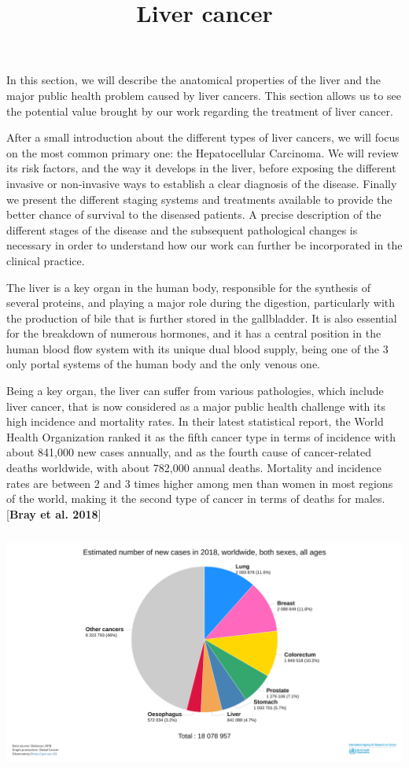 \documentclass[]{article}
\title{\protect\hypertarget{ux5fhfngqw9yg5rj}{}{}Liver cancer}
\date{}
\begin{document}
\maketitle

In this section, we will describe the anatomical properties of the liver
and the major public health problem caused by liver cancers. This
section allows us to see the potential value brought by our work
regarding the treatment of liver cancer.

After a small introduction about the different types of liver cancers,
we will focus on the most common primary one: the Hepatocellular
Carcinoma. We will review its risk factors, and the way it develops in
the liver, before exposing the different invasive or non-invasive ways
to establish a clear diagnosis of the disease. Finally we present the
different staging systems and treatments available to provide the better
chance of survival to the diseased patients. A precise description of
the different stages of the disease and the subsequent pathological
changes is necessary in order to understand how our work can further be
incorporated in the clinical practice.

The liver is a key organ in the human body, responsible for the
synthesis of several proteins, and playing a major role during the
digestion, particularly with the production of bile that is further
stored in the gallbladder. It is also essential for the breakdown of
numerous hormones, and it has a central position in the human blood flow
system with its unique dual blood supply, being one of the 3 only portal
systems of the human body and the only venous one.

Being a key organ, the liver can suffer from various pathologies, which
include liver cancer, that is now considered as a major public health
challenge with its high incidence and mortality rates. In their latest
statistical report, the World Health Organization ranked it as the fifth
cancer type in terms of incidence with about 841,000 new cases annually,
and as the fourth cause of cancer-related deaths worldwide, with about
782,000 annual deaths. Mortality and incidence rates are between 2 and 3
times higher among men than women in most regions of the world, making
it the second type of cancer in terms of deaths for males.
{[}\textbf{Bray et al. 2018}{]}\\
\includegraphics[width=6.25187in,height=3.45313in]{./images/media/image15.png}
\end{document}
